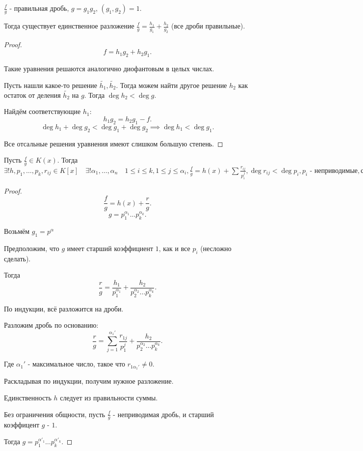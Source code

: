 \begin{lemma} \thmslashn

    $\frac{f}{g}$ - правильная дробь, $g = g_1g_2$, $(g_1, g_2) = 1$.

    Тогда существует единственное разложение $\frac{f}{g} = \frac{h_1}{g_1} + \frac{h_2}{g_2}$ (все дроби правильные).
    \begin{proof}
       \[ f = h_1g_2 + h_2g_1 .\]

       Такие уравнения решаются аналогично диофантовым в целых числах.

       Пусть нашли какое-то решение $\tilde{h_1}, \tilde{h_2}$. Тогда можем найти другое решение $h_2$ как остаток от деления $\tilde{h_2}$ на $g$. Тогда $\deg h_2 < \deg g$. 

       Найдём соответствующие $h_1$:
       \[ h_1g_2 = h_2g_1 - f .\]
       \[ \deg h_1 + \deg g_2 < \deg g_1 + \deg g_2 \implies \deg h_1 < \deg g_1 .\]

       Все отсальные решения уравнения имеют слишком большую степень.
    \end{proof}
\end{lemma}
\begin{theorem} \thmslashn

    Пусть $\frac{f}{g}\in K(x)$. Тогда $\exists!{h,p_1, \ldots, p_{k}, r_{ij}\in K[x]}\quad \exists!{\alpha_1, \ldots, \alpha_{n}}\quad 1 \le i \le k, 1 \le j \le \alpha_{i}, \frac{f}{g} = h(x) + \sum \frac{r_{ij}}{p_{i}^{j}}, \deg r_{ij} < \deg p_{i}, p_{i} \text{ - неприводимые}, \text{старший коэффицент $p_i$ - $1$}, r_{i \alpha_{i}} \neq 0,  $ 
    \begin{proof}
        \[ \frac{f}{g} = h(x) + \frac{r}{g} .\]
        \[ g = p_1^{\alpha_1} \ldots p_{k}^{\alpha_{k}} .\]

        Возьмём $g_1 = p^{\alpha}$

        Предположим, что $g$ имеет старший коэффициент $1$, как и все $p_{i}$ (несложно сделать).

        Тогда
        \[ \frac{r}{g} = \frac{h_1}{p_1^{\alpha_1}} + \frac{h_2}{p_2^{\alpha_2} \ldots p_{k}^{\alpha_{k}}} .\]

        По индукции, всё разложится на дроби.

        Разложим дробь по основанию:
        \[ \frac{r}{g} = \sum\limits_{j=1}^{\alpha_1'}\frac{r_{1j}}{p_1^{j}} + \frac{h_2}{p_2^{\alpha_2}\ldots p_{k}^{\alpha_{k}}} .\] 

        Где $\alpha_1'$ - максимальное число, такое что $r_{1\alpha_1'} \neq 0$.
        
        Раскладывая по индукции, получим нужное разложение.

        Единственность $h$ следует из правильности суммы.

        Без ограничения общности, пусть $\frac{f}{g}$ - неприводимая дробь, и старший коэффицент $g$ - $1$.

        Тогда $g = p_1^{\alpha'_1}\ldots p_{k}^{\alpha'_{k}}$.

    \end{proof}
\end{theorem}
